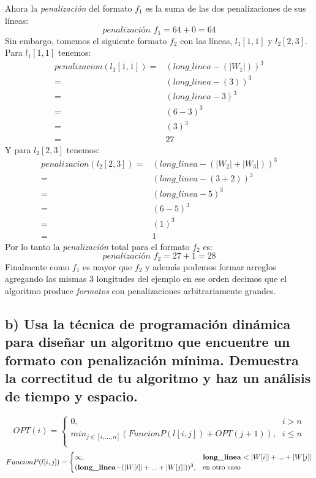 \documentclass[12pt]{article}
\begin{document}
	Ahora la \textit{penalización} del formato $f_1$ es la suma de las dos penalizaciones de sus líneas:
	\begin{equation}
		\textit{penalización $f_1$}= 64 + 0 = 64 
	\end{equation}
	Sin embargo, tomemos el siguiente formato $f_2$ con las líneas, $l_1[1,1]$ y $l_2[2,3]$. Para $l_1[1,1]$ tenemos:
	\begin{equation}
	\begin{split}
	\textit{penalizacion}(l_1[1,1])= & (long\_linea - (|W_1|))^3 \\
	= & (long\_linea - (3))^3 \\
	= & (long\_linea - 3)^3\\
	= & (6 - 3)^3\\
	= & (3)^3 \\
	= & 27
	\end{split}
	\end{equation}
	Y para $l_2[2,3]$ tenemos:
	\begin{equation}
	\begin{split}
	\textit{penalizacion}(l_2[2,3])= & (long\_linea - (|W_2|+|W_3|))^3 \\
	= & (long\_linea - (3 + 2))^3 \\
	= & (long\_linea - 5)^3\\
	= & (6 - 5)^3\\
	= & (1)^3 \\
	= & 1
	\end{split}
	\end{equation}
	Por lo tanto la \textit{penalización} total para el formato $f_2$ es:
	\begin{equation}
	\textit{penalización $f_2$}= 27 + 1 = 28 
	\end{equation}
	Finalmente como $f_1$ es mayor que $f_2$ y además podemos formar arreglos agregando las mismas 3 longitudes del ejemplo en ese orden decimos que el algoritmo produce \textit{formatos} con penalizaciones arbitrariamente grandes.
	\subsection{b) Usa la técnica de programación dinámica para diseñar un algoritmo que encuentre un formato con penalización mínima. Demuestra la correctitud de tu algoritmo y haz un análisis de tiempo y espacio.}
	\begin{equation}\label{f_ej3.2}
	OPT(i) = 
	\begin{cases}
	\text{0,} &\text{$i > n$}\\
	\text{$min_{j \in [i,...,n]}(FuncionP(l[i,j]) + OPT(j + 1))$,} &\text{$i \leq n$} \\
	\end{cases}
	\end{equation}
	\begin{equation}\label{f_ej3.3}
	FuncionP(l[i,j]) = 
	\begin{cases}
	\text{$\infty$,} &\text{\textbf{long\_linea} $< |W[i]| + ... + |W[j]|$}\\
	\text{$($\textbf{long\_linea}$-(|W[i]| + ... + |W[j]|))^3$,} &\text{en otro caso} \\
	\end{cases}
	\end{equation}
\end{document}
